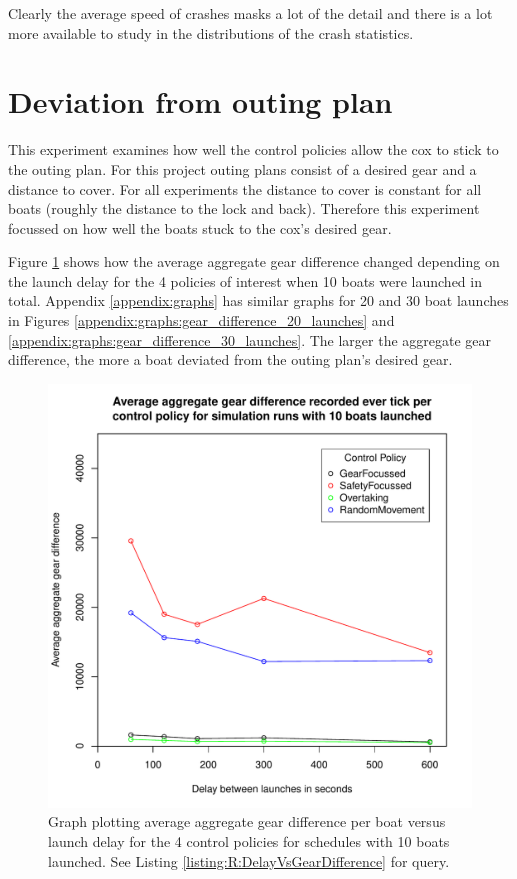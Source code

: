  Clearly the average speed of crashes masks a lot of the detail and there is a lot more available to study in the distributions of the crash statistics.
  
\section{Deviation from outing plan}

This experiment examines how well the control policies allow the cox to stick to the outing plan. For this project outing plans consist of a desired gear and a distance to cover. For all experiments the distance to cover is constant for all boats (roughly the distance to the lock and back). Therefore this experiment focussed on how well the boats stuck to the cox's desired gear.

Figure \ref{experiments:fig:gear_difference_10_launches} shows how the average aggregate gear difference changed depending on the launch delay for the 4 policies of interest when 10 boats were launched in total. Appendix \ref{appendix:graphs} has similar graphs for 20 and 30 boat launches in Figures \ref{appendix:graphs:gear_difference_20_launches} and \ref{appendix:graphs:gear_difference_30_launches}. The larger the aggregate gear difference, the more a boat deviated from the outing plan's desired gear.

\begin{figure}
\begin{center}
  \includegraphics[scale=0.8]{"images/graphs/Average aggregate gear difference recorded ever tick per control policy for simulation runs with 10 boats launched"}
  \caption{Graph plotting average aggregate gear difference per boat versus launch delay for the 4 control policies for schedules with 10 boats launched. See Listing \ref{listing:R:DelayVsGearDifference} for query.}
  \label{experiments:fig:gear_difference_10_launches}
\end{center}
\end{figure}


